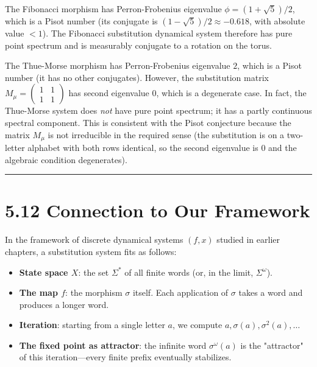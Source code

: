 \begin{example}
The Fibonacci morphism has Perron-Frobenius eigenvalue $\phi = (1+\sqrt{5})/2$, which is a Pisot number (its conjugate is $(1-\sqrt{5})/2 \approx -0.618$, with absolute value $< 1$). The Fibonacci substitution dynamical system therefore has pure point spectrum and is measurably conjugate to a rotation on the torus.
\end{example}

\begin{example}
The Thue-Morse morphism has Perron-Frobenius eigenvalue $2$, which is a Pisot number (it has no other conjugates). However, the substitution matrix $M_\mu = \left(\begin{smallmatrix}1&1\\1&1\end{smallmatrix}\right)$ has second eigenvalue $0$, which is a degenerate case. In fact, the Thue-Morse system does \textit{not} have pure point spectrum; it has a partly continuous spectral component. This is consistent with the Pisot conjecture because the matrix $M_\mu$ is not irreducible in the required sense (the substitution is on a two-letter alphabet with both rows identical, so the second eigenvalue is $0$ and the algebraic condition degenerates).

\bigskip\hrule\bigskip
\end{example}

\section{5.12 Connection to Our Framework}

In the framework of discrete dynamical systems $(f, x)$ studied in earlier chapters, a substitution system fits as follows:

\begin{itemize}
  \item \textbf{State space $X$}: the set $\Sigma^*$ of all finite words (or, in the limit, $\Sigma^\omega$).
  \item \textbf{The map $f$}: the morphism $\sigma$ itself. Each application of $\sigma$ takes a word and produces a longer word.
  \item \textbf{Iteration}: starting from a single letter $a$, we compute $a, \sigma(a), \sigma^2(a), \ldots$
  \item \textbf{The fixed point as attractor}: the infinite word $\sigma^\omega(a)$ is the "attractor" of this iteration---every finite prefix eventually stabilizes.
\end{itemize}

